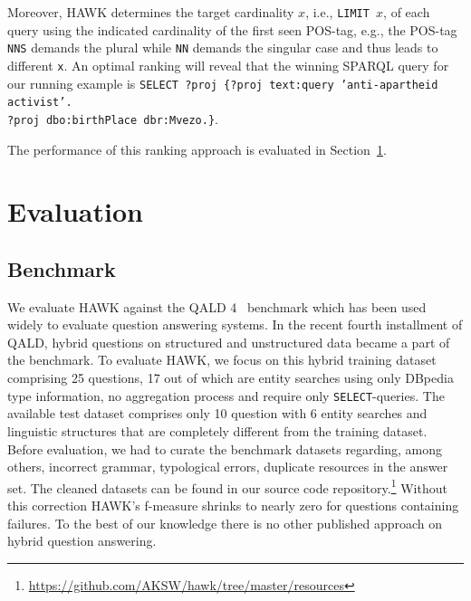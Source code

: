 Moreover, HAWK determines the target cardinality $x$, i.e., \texttt{LIMIT $x$}, of each query using the indicated cardinality of the first seen POS-tag, e.g., the POS-tag \texttt{NNS} demands the plural while \texttt{NN} demands the singular case and thus leads to different \texttt{x}.
An optimal ranking will reveal that the winning SPARQL query for our running example is \texttt{SELECT ?proj  \{?proj text:query 'anti-apartheid activist'.\\ ?proj dbo:birthPlace dbr:Mvezo.\}}.


The performance of this ranking approach is evaluated in Section~\ref{chahawk:sec:evaluation}.




\section{Evaluation}
\label{chahawk:sec:evaluation}

\subsection{Benchmark}

We evaluate HAWK against the \ac{QALD} 4~\cite{qald4} benchmark which has been used widely to evaluate question answering systems. %
In the recent fourth installment of \ac{QALD}, hybrid questions on structured and unstructured data became a part of the benchmark.
To evaluate HAWK, we focus on this hybrid training dataset comprising 25 questions, 17 out of which are entity searches using only DBpedia type information, no aggregation process and require only \texttt{SELECT}-queries. 
The available test dataset comprises only 10 question with 6 entity searches and linguistic structures that are completely different from the training dataset.
Before evaluation, we had to curate the benchmark datasets regarding, among others, incorrect grammar, typological errors, duplicate resources in the answer set.
The cleaned datasets can be found in our source code repository.\footnote{\url{https://github.com/AKSW/hawk/tree/master/resources}}
Without this correction HAWK's f-measure shrinks to nearly zero for questions containing failures.
To the best of our knowledge there is no other published approach on hybrid question answering.
 
